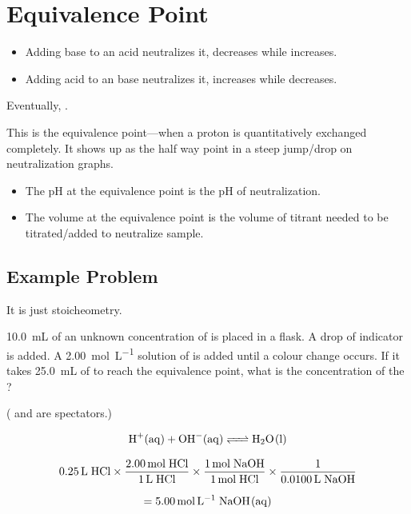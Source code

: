 \documentclass[a4paper,12pt]{article}
\begin{document}
\section{Equivalence Point}
\begin{itemize}
    \item{Adding base to an acid neutralizes it, \ce{[ H+ ]} decreases while \ce{[ OH- ]} increases.}
    \item{Adding acid to an base neutralizes it, \ce{[ H+ ]} increases while \ce{[ OH- ]} decreases.}
\end{itemize}

Eventually, \ce{[ H+ ] = [ OH- ]}.

This is the equivalence point---when a proton is quantitatively exchanged completely. It shows up as the half way point in a steep jump/drop on neutralization graphs.

\begin{itemize}
    \item{The pH at the equivalence point is the pH of neutralization.}
    \item{The volume at the equivalence point is the volume of titrant needed to be titrated/added to neutralize sample.}
\end{itemize}

\subsection{Example Problem}
It is just stoicheometry.

\SI{10.0}{\mL} of an unknown concentration of  is placed in a flask. A drop of indicator is added. A \SI{2.00}{\mol\per\L} solution of  is added until a colour change occurs. If it takes \SI{25.0}{\mL} of  to reach the equivalence point, what is the concentration of the ?

( and  are spectators.)

$$\ce{H+(aq) + OH-(aq) <=> H2O(l)}$$

$$\SI{0.25}{\L}\;\ce{HCl} \times \frac{\SI{2.00}{\mol}\;\ce{HCl}}{\SI{1}{\L}\;\ce{HCl}} \times \frac{\SI{1}{\mol}\;\ce{NaOH}}{\SI{1}{\mol}\;\ce{HCl}} \times \frac{1}{\SI{0.0100}{\L}\;\ce{NaOH}}$$

$$=\SI{5.00}{\mol\per\L}\;\ce{NaOH(aq)}$$
\end{document}
